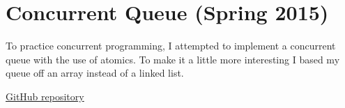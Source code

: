 
\section{Concurrent Queue (Spring 2015)}

To practice concurrent programming, I attempted to implement a
concurrent queue with the use of atomics. To make it a little more
interesting I based my queue off an array instead of a linked list.

\href{https://github.com/MichaelMitchellM/AtomicQueue}{GitHub repository}